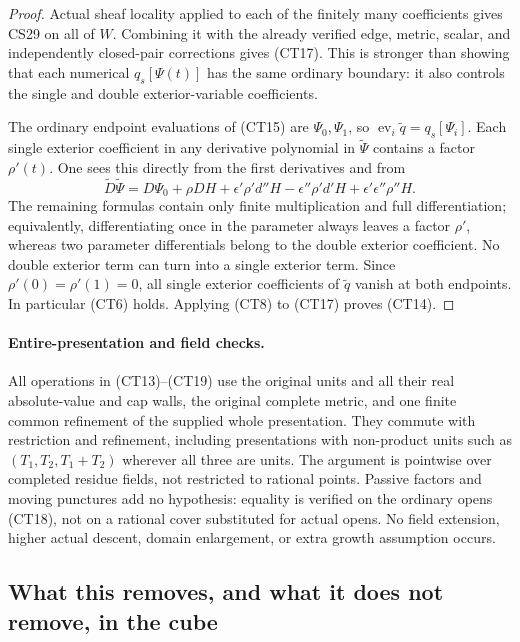 \begin{proof}
Actual sheaf locality applied to each of the finitely many coefficients
gives CS29 on all of $W$.  Combining it with the already verified
edge, metric, scalar, and independently closed-pair corrections gives
(CT17).  This is stronger than showing that each numerical
$q_s[\Psi(t)]$ has the same ordinary boundary: it also controls
the single and double exterior-variable coefficients.

The ordinary endpoint evaluations of (CT15) are $\Psi_0,\Psi_1$,
so $\operatorname{ev}_i\widetilde q=q_s[\Psi_i]$.  Each single
exterior coefficient in any derivative polynomial in
$\widetilde\Psi$ contains a factor $\rho'(t)$.  One sees this
directly from the first derivatives and from
\[
 \widetilde D\widetilde\Psi
  =D\Psi_0+\rho DH
   +\epsilon'\rho' d''H-\epsilon''\rho' d'H
   +\epsilon'\epsilon''\rho''H.
 \tag{CT19}
\]
The remaining formulas contain only finite multiplication and full
differentiation; equivalently, differentiating once in the parameter
always leaves a factor $\rho'$, whereas two parameter differentials
belong to the double exterior coefficient.  No double exterior term
can turn into a single exterior term.  Since $\rho'(0)=\rho'(1)=0$,
all single exterior coefficients of $\widetilde q$ vanish at both
endpoints.  In particular (CT6) holds.  Applying (CT8) to (CT17)
proves (CT14).
\end{proof}

\paragraph{Entire-presentation and field checks.}
All operations in (CT13)--(CT19) use the original units and all their
real absolute-value and cap walls, the original complete metric,
and one finite common refinement of the supplied whole presentation.
They commute with restriction and refinement, including presentations
with non-product units such as $(T_1,T_2,T_1+T_2)$ wherever all three
are units.  The argument is pointwise over completed residue fields,
not restricted to rational points.  Passive factors and moving
punctures add no hypothesis: equality is verified on the ordinary
opens (CT18), not on a rational cover substituted for actual opens.
No field extension, higher actual descent, domain enlargement, or
extra growth assumption occurs.

\subsection{What this removes, and what it does not remove, in the cube}

